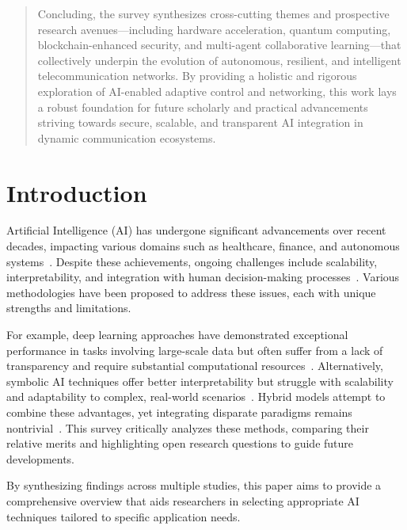 \documentclass[sigconf]{acmart}
\begin{document}
\begin{abstract}
Concluding, the survey synthesizes cross-cutting themes and prospective research avenues—including hardware acceleration, quantum computing, blockchain-enhanced security, and multi-agent collaborative learning—that collectively underpin the evolution of autonomous, resilient, and intelligent telecommunication networks. By providing a holistic and rigorous exploration of AI-enabled adaptive control and networking, this work lays a robust foundation for future scholarly and practical advancements striving towards secure, scalable, and transparent AI integration in dynamic communication ecosystems.
\end{abstract}

\maketitle

\section{Introduction}

Artificial Intelligence (AI) has undergone significant advancements over recent decades, impacting various domains such as healthcare, finance, and autonomous systems~\cite{smith2020advances}. Despite these achievements, ongoing challenges include scalability, interpretability, and integration with human decision-making processes~\cite{johnson2019challenges}. Various methodologies have been proposed to address these issues, each with unique strengths and limitations.

For example, deep learning approaches have demonstrated exceptional performance in tasks involving large-scale data but often suffer from a lack of transparency and require substantial computational resources~\cite{liu2021deep}. Alternatively, symbolic AI techniques offer better interpretability but struggle with scalability and adaptability to complex, real-world scenarios~\cite{miller2018symbolic}. Hybrid models attempt to combine these advantages, yet integrating disparate paradigms remains nontrivial~\cite{chen2022hybrid}. This survey critically analyzes these methods, comparing their relative merits and highlighting open research questions to guide future developments.

By synthesizing findings across multiple studies, this paper aims to provide a comprehensive overview that aids researchers in selecting appropriate AI techniques tailored to specific application needs.
\end{document}

